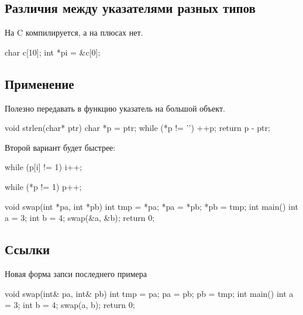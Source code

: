 \subsection{Различия между указателями разных типов}
На C компилируется, а на плюсах нет.
\begin{ccode}
char c[10];
int *pi = &c[0];
\end{ccode}
\subsection{Применение}
Полезно передавать в функцию указатель на большой объект.
\begin{ccode}
void strlen(char* ptr) {
    char *p = ptr;
    while (*p != '\0') 
        ++p;
    return p - ptr;
}
\end{ccode}
Второй вариант будет быстрее:
\begin{ccode}
while (p[i] != 1)
    i++;

while (*p != 1)
    p++;
\end{ccode}
\begin{ccode}
void swap(int *pa, int *pb) {
    int tmp = *pa;
    *pa = *pb;
    *pb = tmp;
}
int main() {
    int a = 3; int b = 4;
    swap(&a, &b);
    return 0;
}
\end{ccode}
\subsection{Ссылки}
Новая форма запси последнего примера
\begin{ccode}
void swap(int& pa, int& pb) {
    int tmp = pa;
    pa = pb;
    pb = tmp;
}
int main() {
    int a = 3; int b = 4;
    swap(a, b);
    return 0;
}
\end{ccode}

% 
